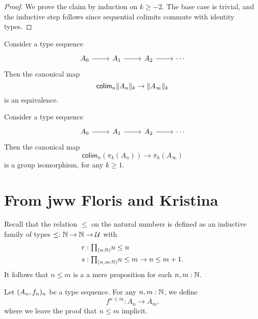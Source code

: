 \begin{proof}
We prove the claim by induction on $k\geq -2$. The base case is trivial, and the inductive step follows since sequential colimits commute with identity types.
\end{proof}

\begin{thm}
Consider a type sequence
\begin{equation*}
\begin{tikzcd}
A_0 \arrow[r] & A_1 \arrow[r] & A_2 \arrow[r] & \cdots
\end{tikzcd}
\end{equation*}
Then the canonical map
\begin{equation*}
\mathsf{colim}_n \trunc{k}{A_n} \to \trunc{k}{A_\infty}
\end{equation*}
is an equivalence. 
\end{thm}

\begin{thm}\label{thm:colim_hgroup}
Consider a type sequence
\begin{equation*}
\begin{tikzcd}
A_0 \arrow[r] & A_1 \arrow[r] & A_2 \arrow[r] & \cdots
\end{tikzcd}
\end{equation*}
Then the canonical map
\begin{equation*}
\mathsf{colim}_n(\pi_k(A_n))\to \pi_k(A_\infty)
\end{equation*}
is a group isomorphism, for any $k\geq 1$.
\end{thm}

\section{From jww Floris and Kristina}
Recall that the relation $\leq$ on the natural numbers is defined as an inductive family of types $\leq:\N\to\N\to\UU$ with
\begin{align*}
r & : \prd{n:\N} n\leq n \\
s & : \prd{n,m:\N} n\leq m \to n\leq m+1.
\end{align*}
It follows that $n\leq m$ is a a mere proposition for each $n,m:\N$.

\begin{defn}
Let $\sequence{A}{f}$ be a type sequence. For any $n,m:\nat$, we define
\begin{equation*}
f^{n\leq m} : A_n\to A_m.
\end{equation*}
where we leave the proof that $n\leq m$ implicit.
\end{defn}

